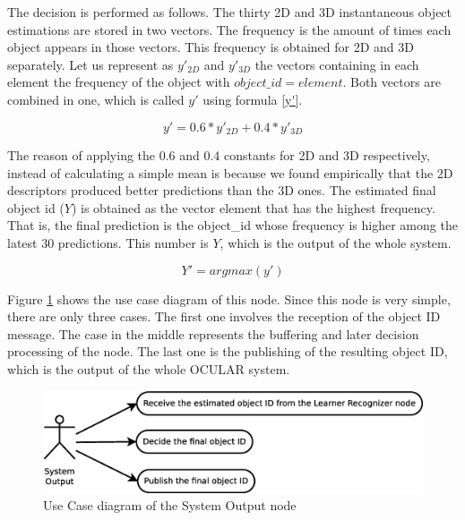 	The decision is performed as follows. 
	The thirty 2D and 3D instantaneous object estimations are stored in two vectors. 
	The frequency is the amount of times each object appears in those vectors. 
	This frequency is obtained for 2D and 3D separately.  
	Let us represent as $y'_{2D}$ and $y'_{3D}$ the vectors containing in each element the frequency of the object with $object\_id = element$. 
	Both vectors are combined in one, which is called $y'$ using formula \ref{y'}. 
	\begin{center}
	\begin{equation}
	\label{y'}
	y'=0.6*y'_{2D}+0.4*y'_{3D}
	\end{equation}
	\end{center}
	The reason of applying the 0.6 and 0.4 constants for 2D and 3D respectively, instead of calculating a simple mean is because we found empirically that the 2D descriptors produced better predictions than the 3D ones.
	The estimated final object id ($Y$) is obtained as the vector element that has the highest frequency. 
	That is, the final prediction is the object\_id whose frequency is higher among the latest 30 predictions.
	This number is $Y$, which is the output of the whole system. 
	\begin{center}
	\begin{equation}
	\label{Y'}
	Y'= argmax(y')
	\end{equation}
	\end{center} 
	Figure \ref{uc_output} shows the use case diagram of this node. 
	Since this node is very simple, there are only three cases. 
	The first one involves the reception of the object ID message. 
	The case in the middle represents the buffering and later decision processing of the node. 
	The last one is the publishing of the resulting object ID, which is the output of the whole OCULAR system. 

	\begin{figure}[H]
		\centering
			\includegraphics[scale=0.4]{img/diagrams/uc_system_output.eps}
			\caption[Use case diagram System Output node]{Use Case diagram of the System Output node}
			\label{uc_output}
	\end{figure}